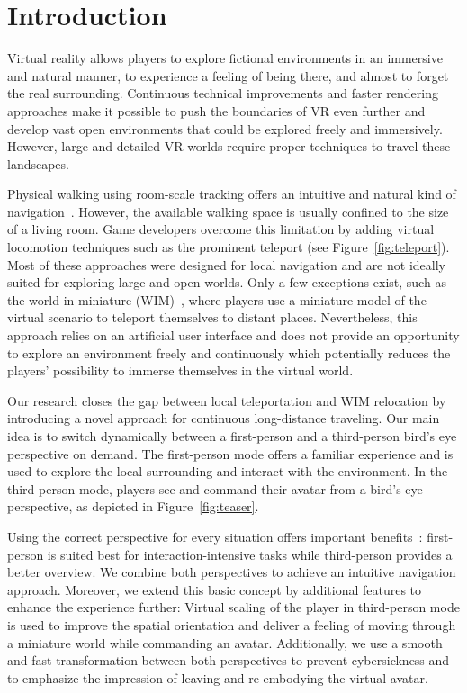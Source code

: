 \documentclass{sigchi}
\begin{document}
\section{Introduction}
Virtual reality allows players to explore fictional environments in an immersive and natural manner, to experience a feeling of being there, and almost to forget the real surrounding. Continuous technical improvements and faster rendering approaches make it possible to push the boundaries of VR even further and develop vast open environments that could be explored freely and immersively. However, large and detailed VR worlds require proper techniques to travel these landscapes.\par
Physical walking using room-scale tracking offers an intuitive and natural kind of navigation~\cite{ruddle2009benefits}. However, the available walking space is usually confined to the size of a living room. Game developers overcome this limitation by adding virtual locomotion techniques such as the prominent teleport (see Figure~\ref{fig:teleport}). Most of these approaches were designed for local navigation and are not ideally suited for exploring large and open worlds. Only a few exceptions exist, such as the world-in-miniature (WIM)~\cite{stoakley1995virtual}, where players use a miniature model of the virtual scenario to teleport themselves to distant places. Nevertheless, this approach relies on an artificial user interface and does not provide an opportunity to explore an environment freely and continuously which potentially reduces the players' possibility to immerse themselves in the virtual world.\par
Our research closes the gap between local teleportation and WIM relocation by introducing a novel approach for continuous long-distance traveling. Our main idea is to switch dynamically between a first-person and a third-person bird's eye perspective on demand. The first-person mode offers a familiar experience and is used to explore the local surrounding and interact with the environment. In the third-person mode, players see and command their avatar from a bird's eye perspective, as depicted in Figure~\ref{fig:teaser}.\par
Using the correct perspective for every situation offers important benefits~\cite{gorisse2017first}: first-person is suited best for interaction-intensive tasks while third-person provides a better overview. We combine both perspectives to achieve an intuitive navigation approach. Moreover, we extend this basic concept by additional features to enhance the experience further: Virtual scaling of the player in third-person mode is used to improve the spatial orientation and deliver a feeling of moving through a miniature world while commanding an avatar. Additionally, we use a smooth and fast transformation between both perspectives to prevent cybersickness and to emphasize the impression of leaving and re-embodying the virtual avatar.\par
\end{document}

